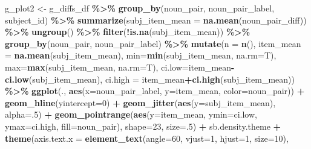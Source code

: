 \documentclass[
  doc,floatsintext]{apa6}
\newenvironment{Shaded}{\begin{snugshade}}{\end{snugshade}}
\newcommand{\AttributeTok}[1]{\textcolor[rgb]{0.13,0.29,0.53}{#1}}
\newcommand{\DecValTok}[1]{\textcolor[rgb]{0.00,0.00,0.81}{#1}}
\newcommand{\FunctionTok}[1]{\textcolor[rgb]{0.13,0.29,0.53}{\textbf{#1}}}
\newcommand{\NormalTok}[1]{#1}
\newcommand{\OtherTok}[1]{\textcolor[rgb]{0.56,0.35,0.01}{#1}}
\newcommand{\SpecialCharTok}[1]{\textcolor[rgb]{0.81,0.36,0.00}{\textbf{#1}}}
\begin{document}
\begin{Shaded}
\begin{Highlighting}[]
\NormalTok{g\_plot2 }\OtherTok{\textless{}{-}}\NormalTok{ g\_diffs\_df }\SpecialCharTok{\%\textgreater{}\%} 
  \FunctionTok{group\_by}\NormalTok{(noun\_pair, noun\_pair\_label, subject\_id) }\SpecialCharTok{\%\textgreater{}\%}
  \FunctionTok{summarize}\NormalTok{(}\AttributeTok{subj\_item\_mean =} \FunctionTok{na.mean}\NormalTok{(noun\_pair\_diff)) }\SpecialCharTok{\%\textgreater{}\%}
  \FunctionTok{ungroup}\NormalTok{() }\SpecialCharTok{\%\textgreater{}\%}
  \FunctionTok{filter}\NormalTok{(}\SpecialCharTok{!}\FunctionTok{is.na}\NormalTok{(subj\_item\_mean)) }\SpecialCharTok{\%\textgreater{}\%}
  \FunctionTok{group\_by}\NormalTok{(noun\_pair, noun\_pair\_label) }\SpecialCharTok{\%\textgreater{}\%}
  \FunctionTok{mutate}\NormalTok{(}\AttributeTok{n =} \FunctionTok{n}\NormalTok{(),}
            \AttributeTok{item\_mean =} \FunctionTok{na.mean}\NormalTok{(subj\_item\_mean),}
            \AttributeTok{min=}\FunctionTok{min}\NormalTok{(subj\_item\_mean, }\AttributeTok{na.rm=}\NormalTok{T),}
            \AttributeTok{max=}\FunctionTok{max}\NormalTok{(subj\_item\_mean, }\AttributeTok{na.rm=}\NormalTok{T),}
            \AttributeTok{ci.low=}\NormalTok{item\_mean}\SpecialCharTok{{-}}\FunctionTok{ci.low}\NormalTok{(subj\_item\_mean),}
            \AttributeTok{ci.high =}\NormalTok{ item\_mean}\SpecialCharTok{+}\FunctionTok{ci.high}\NormalTok{(subj\_item\_mean)) }\SpecialCharTok{\%\textgreater{}\%}
  \FunctionTok{ggplot}\NormalTok{(., }\FunctionTok{aes}\NormalTok{(}\AttributeTok{x=}\NormalTok{noun\_pair\_label, }\AttributeTok{y=}\NormalTok{item\_mean, }\AttributeTok{color=}\NormalTok{noun\_pair)) }\SpecialCharTok{+}
    \FunctionTok{geom\_hline}\NormalTok{(}\AttributeTok{yintercept=}\DecValTok{0}\NormalTok{) }\SpecialCharTok{+}
  \FunctionTok{geom\_jitter}\NormalTok{(}\FunctionTok{aes}\NormalTok{(}\AttributeTok{y=}\NormalTok{subj\_item\_mean), }\AttributeTok{alpha=}\NormalTok{.}\DecValTok{5}\NormalTok{) }\SpecialCharTok{+}
  \FunctionTok{geom\_pointrange}\NormalTok{(}\FunctionTok{aes}\NormalTok{(}\AttributeTok{y=}\NormalTok{item\_mean, }\AttributeTok{ymin=}\NormalTok{ci.low, }\AttributeTok{ymax=}\NormalTok{ci.high, }
                      \AttributeTok{fill=}\NormalTok{noun\_pair), }\AttributeTok{shape=}\DecValTok{23}\NormalTok{, }\AttributeTok{size=}\NormalTok{.}\DecValTok{5}\NormalTok{) }\SpecialCharTok{+} 
\NormalTok{  sb.density.theme }\SpecialCharTok{+}
  \FunctionTok{theme}\NormalTok{(}\AttributeTok{axis.text.x =} \FunctionTok{element\_text}\NormalTok{(}\AttributeTok{angle=}\DecValTok{60}\NormalTok{, }\AttributeTok{vjust=}\DecValTok{1}\NormalTok{, }\AttributeTok{hjust=}\DecValTok{1}\NormalTok{, }\AttributeTok{size=}\DecValTok{10}\NormalTok{),}

\end{Highlighting}
\end{Shaded}
\end{document}

